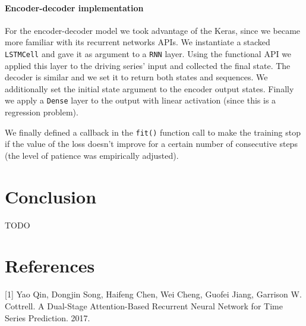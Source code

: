 \documentclass{article}
\begin{document}
\paragraph{Encoder-decoder implementation}

For the encoder-decoder model we took advantage of the Keras, since we became more
familiar with its recurrent networks APIs. We instantiate a stacked 
\texttt{LSTMCell} and gave it as argument to a \texttt{RNN} layer. Using the 
functional API we applied this layer to the driving series' input and collected
the final state. The decoder is similar and we set it to return both states and 
sequences. We additionally set the initial state argument to the encoder output 
states. Finally we apply a \texttt{Dense} layer to the output with linear 
activation (since this is a regression problem).

We finally defined a callback in the \texttt{fit()} function call to make the
training stop if the value of the loss doesn't improve for a certain number of 
consecutive steps (the level of patience was empirically adjusted).

\section{Conclusion}

TODO

\section*{References}

\small

[1] Yao Qin, Dongjin Song, Haifeng Chen, Wei Cheng, Guofei Jiang, Garrison W.
Cottrell. A Dual-Stage Attention-Based Recurrent Neural Network for Time Series
Prediction. 2017.
\end{document}
